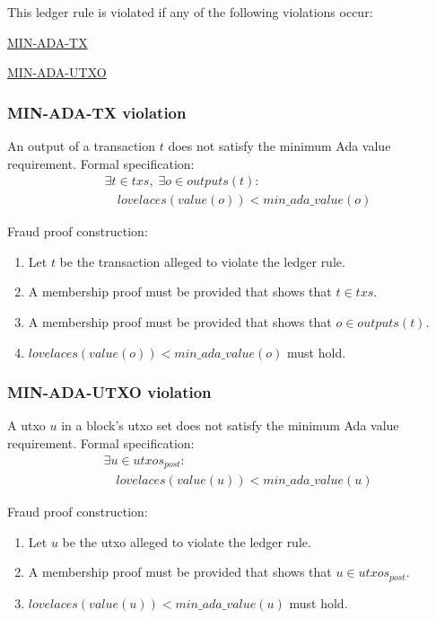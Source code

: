 \documentclass[../midgard.tex]{subfiles}
\begin{document}
\todo

This ledger rule is violated if any of the following violations occur:
\begin{itemize-multi}
  \item \hyperref[violation:MIN-ADA-TX]{MIN-ADA-TX}
  \item \hyperref[violation:MIN-ADA-UTXO]{MIN-ADA-UTXO}
\end{itemize-multi}

\subsubsection{MIN-ADA-TX violation}
\label{violation:MIN-ADA-TX}
An output of a transaction $t$ does not satisfy the minimum Ada value requirement.
Formal specification:
\begin{equation*}
\begin{split}
  &\exists t \in txs,\; \exists o \in outputs(t):\\
    &\quad lovelaces(value(o)) < min\_ada\_value(o)
\end{split}
\end{equation*}

Fraud proof construction:
\begin{enumerate}
  \item Let $t$ be the transaction alleged to violate the ledger rule.
  \item A membership proof must be provided that shows that $t \in txs$.
  \item A membership proof must be provided that shows that $o \in outputs(t)$.
  \item $lovelaces(value(o)) < min\_ada\_value(o)$ must hold.
\end{enumerate}

\subsubsection{MIN-ADA-UTXO violation}
\label{violation:MIN-ADA-UTXO}
A utxo $u$ in a block's utxo set does not satisfy the minimum Ada value requirement.
Formal specification:
\begin{equation*}
\begin{split}
  &\exists u \in utxos_{post}:\\
    &\quad lovelaces(value(u)) < min\_ada\_value(u)
\end{split}
\end{equation*}

Fraud proof construction:
\begin{enumerate}
  \item Let $u$ be the utxo alleged to violate the ledger rule.
  \item A membership proof must be provided that shows that $u \in utxos_{post}$.
  \item $lovelaces(value(u)) < min\_ada\_value(u)$ must hold.
\end{enumerate}
\end{document}
